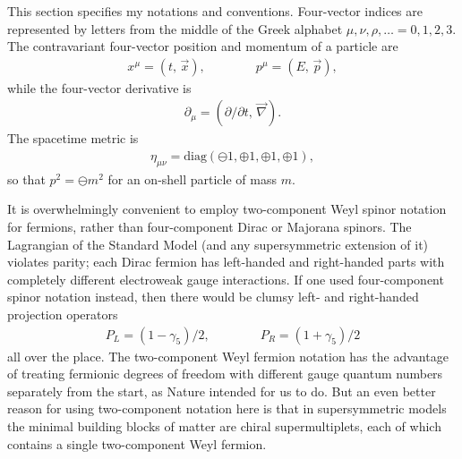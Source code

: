 \documentclass[12pt]{article}
\def\BDpos{}
\def\BDplus{+}
\def\BDminus{-}
\def\BDpos{-}
\def\BDplus{-}
\def\BDminus{+}
\def\BDpos{\oplus}
\def\BDplus{\oplus}
\def\BDminus{\ominus}
\def\BDpos{\ominus}
\def\BDplus{\ominus}
\def\BDminus{\oplus}
\def\beq{\begin{eqnarray}}
\def\eeq{\end{eqnarray}}
\begin{document}
This section specifies my notations and conventions.  Four-vector indices
are represented by letters from the middle of the Greek alphabet
$\mu,\nu,\rho,\dots= 0,1,2,3$. The contravariant four-vector position and
momentum of a particle are
\beq
x^\mu = (t,\, \vec{x}), \qquad\qquad p^\mu = (E,\, \vec{p}) ,
\eeq
while the four-vector derivative is
\beq
\partial_\mu = ({\partial / \partial t},\, \vec{\nabla}) .
\eeq
The spacetime metric is 
\beq
\eta_{\mu\nu} = 
{\mbox{diag}}(\BDplus 1, \BDminus 1, \BDminus 1, \BDminus 1), 
\eeq
so that $p^2 = \BDpos m^2$ for an on-shell particle of mass $m$.

It is overwhelmingly convenient to employ two-component Weyl spinor
notation for fermions, rather than four-component Dirac or Majorana
spinors. The Lagrangian of the Standard Model (and any supersymmetric
extension of it) violates parity; each Dirac fermion has left-handed and
right-handed parts with completely different electroweak gauge
interactions. If one used four-component spinor notation instead, then
there would be clumsy left- and right-handed projection operators
\beq
P_L = (1 - \gamma_5)/2, \qquad\qquad
P_R = (1 + \gamma_5)/2
\eeq
all over the place. The two-component Weyl fermion notation has the
advantage of treating fermionic degrees of freedom with different gauge
quantum numbers separately from the start, as Nature intended for us to
do. But an even better reason for using two-component notation here is
that in supersymmetric models the minimal building blocks of matter are
chiral supermultiplets, each of which contains a single two-component Weyl
fermion. 
\end{document}
